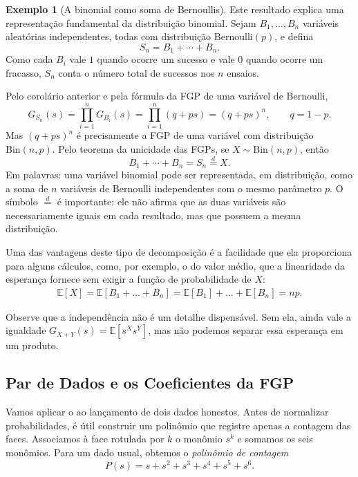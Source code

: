 \documentclass[12pt,portuguese]{article}
\theoremstyle{definition}
\newtheorem{example}[example]{Exemplo}
\theoremstyle{plainexercise}
\theoremstyle{starredexercise}
\theoremstyle{definition}
\begin{document}
\begin{example}[A binomial como soma de Bernoullis]\label{ex:binomial-soma-bernoullis}
Este resultado explica uma representação fundamental da distribuição binomial.
Sejam $B_1,\ldots,B_n$ variáveis aleatórias independentes, todas com
distribuição $\mathrm{Bernoulli}(p)$, e defina
\[
S_n=B_1+\cdots+B_n.
\]
Como cada $B_i$ vale $1$ quando ocorre um sucesso e vale $0$ quando ocorre um
fracasso, $S_n$ conta o número total de sucessos nos $n$ ensaios.

Pelo corolário anterior e pela fórmula da FGP de uma variável de Bernoulli,
\[
G_{S_n}(s)
=\prod_{i=1}^{n}G_{B_i}(s)
=\prod_{i=1}^{n}(q+ps)
=(q+ps)^n,
\qquad q=1-p.
\]
Mas $(q+ps)^n$ é precisamente a FGP de uma variável com distribuição
$\mathrm{Bin}(n,p)$. Pelo teorema da unicidade das FGPs, se
$X\sim\mathrm{Bin}(n,p)$, então
\[
B_1+\cdots+B_n=S_n\overset{d}{=}X.
\]
Em palavras: uma variável binomial pode ser representada, em distribuição,
como a soma de $n$ variáveis de Bernoulli independentes com o mesmo parâmetro
$p$. O símbolo $\overset{d}{=}$ é importante: ele não afirma que as duas
variáveis são necessariamente iguais em cada resultado, mas que possuem a
mesma distribuição.

Uma das vantagens deste tipo de decomposição é a facilidade que ela proporciona
para alguns cálculos, como, por exemplo, o do valor médio, que a linearidade da
esperança fornece sem exigir a função de probabilidade de $X$:
\begin{align*}
\mathbb{E}[X] = \mathbb{E}[B_1+\ldots+B_n] = \mathbb{E}[B_1]+\ldots+\mathbb{E}[B_n] = np.
\end{align*}  
\end{example}

Observe que a independência não é um detalhe dispensável.
Sem ela, ainda vale a igualdade
$G_{X+Y}(s)=\mathbb{E}[s^Xs^Y]$,
mas não podemos separar essa esperança em um produto.

\subsection{Par de Dados e os Coeficientes da FGP}\label{sec:produto-dados}

Vamos aplicar o  ao lançamento de dois dados honestos.
Antes de normalizar probabilidades,
é útil construir um polinômio que registre apenas a contagem das faces.
Associamos à face rotulada por $k$ o monômio $s^k$ e somamos os seis
monômios.
Para um dado usual, obtemos o \emph{polinômio de contagem}
\[
P(s)=s+s^2+s^3+s^4+s^5+s^6.
\]
\end{document}
